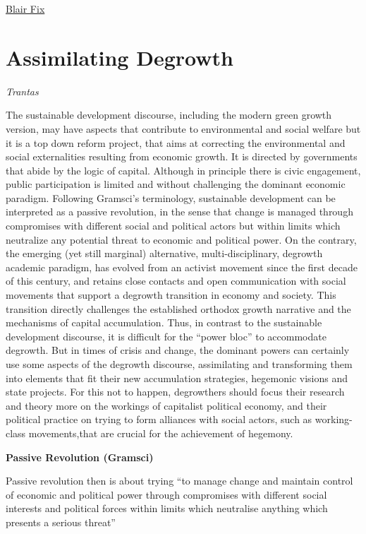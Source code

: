 \documentclass[
]{book}
\begin{document}
\href{https://economicsfromthetopdown.com/2021/02/26/radically-progressive-degrowth-reducing-resource-use-by-eliminating-inequality/}{Blair Fix}

\hypertarget{assimilating-degrowth}{%
\section{Assimilating Degrowth}\label{assimilating-degrowth}}

\emph{Trantas}

The sustainable development discourse, including the modern green growth version, may have aspects that contribute to environmental and social welfare but it is a top down reform project, that aims at correcting the environmental and social externalities resulting from economic growth. It is directed by governments that abide by the logic of capital. Although in principle there is civic engagement, public participation is limited and without challenging the dominant economic paradigm. Following Gramsci's terminology, sustainable development can be interpreted as a passive revolution, in the sense that change is managed through compromises with different social and political actors but within limits which neutralize any potential threat to economic and political power. On the contrary, the emerging (yet still marginal) alternative, multi-disciplinary, degrowth academic paradigm, has evolved from an activist movement since the first decade of this century, and retains close contacts and open communication with social movements that support a degrowth transition in economy and society. This transition directly challenges the established orthodox growth narrative and the mechanisms of capital accumulation. Thus, in contrast to the sustainable development discourse, it is difficult for the ``power bloc'' to accommodate degrowth. But in times of crisis and change, the dominant powers can certainly use some aspects of the degrowth discourse, assimilating and transforming them into elements that fit their new accumulation strategies, hegemonic visions and state projects. For this not to happen, degrowthers should focus their research and theory more on the workings of capitalist political economy, and their political practice on trying to form alliances with social actors, such as working-class movements,that are crucial for the achievement of hegemony.

\textbf{Passive Revolution (Gramsci)}

Passive revolution then is about trying ``to manage change
and maintain control of economic and political power through compromises with different social interests and
political forces within limits which neutralise anything which presents a serious threat''
\end{document}
